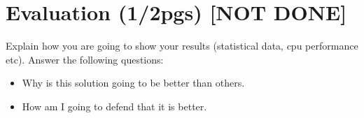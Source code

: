 
% 
% 

\section{Evaluation (1/2pgs)  [NOT DONE]}

Explain how you are going to show your results (statistical data, cpu performance etc). Answer the following questions:
\begin{itemize}
  \item Why is this solution going to be better than others.
  \item How am I going to defend that it is better.
\end{itemize}